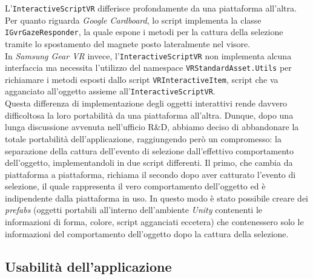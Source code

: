 L'\texttt{InteractiveScriptVR} differisce profondamente da una piattaforma all'altra. \\
Per quanto riguarda \textit{Google Cardboard}, lo script implementa la classe \texttt{IGvrGazeResponder}, la quale espone i metodi per la cattura della selezione tramite lo spostamento del magnete posto lateralmente nel visore. \\
In \textit{Samsung Gear VR} invece, l'\texttt{InteractiveScriptVR} non implementa alcuna interfaccia ma necessita l'utilizzo del namespace \texttt{VRStandardAsset.Utils} per richiamare i metodi esposti dallo script \texttt{VRInteractiveItem}, script che va agganciato all'oggetto assieme all'\texttt{InteractiveScriptVR}. \\
Questa differenza di implementazione degli oggetti interattivi rende davvero difficoltosa la loro portabilità da una piattaforma all'altra. Dunque, dopo una lunga discussione avvenuta nell'ufficio R\&D, abbiamo deciso di abbandonare la totale portabilità dell'applicazione, raggiungendo però un compromesso: la separazione della cattura dell'evento di selezione dall'effettivo comportamento dell'oggetto, implementandoli in due script differenti. Il primo, che cambia da piattaforma a piattaforma, richiama il secondo dopo aver catturato l'evento di selezione, il quale rappresenta il vero comportamento dell'oggetto ed è indipendente dalla piattaforma in uso. In questo modo è stato possibile creare dei \textit{prefabs} (oggetti portabili all'interno dell'ambiente \textit{Unity} contenenti le informazioni di forma, colore, script agganciati eccetera) che contenessero solo le informazioni del comportamento dell'oggetto dopo la cattura della selezione.    

\subsection{Usabilità dell'applicazione}

